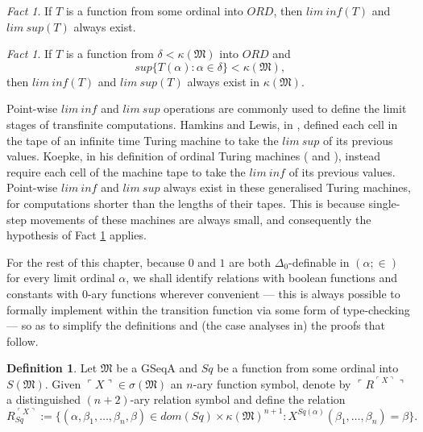 \documentclass[12pt, twoside]{memoir}
\numberwithin{equation}{section}
\theoremstyle{definition}
\newtheorem{defi}[thm]{Definition}
\theoremstyle{remark}
\newtheorem{fact}[thm]{Fact}
\theoremstyle{definition}
\theoremstyle{definition}
\theoremstyle{definition}
\theoremstyle{remark}
\begin{document}
\begin{fact}
If $T$ is a function from some ordinal into $ORD$, then $lim \ inf (T)$ and $lim \ sup (T)$ always exist.
\end{fact}

\begin{fact}\label{fact230}
If $T$ is a function from $\delta < \kappa(\mathfrak{M})$ into $ORD$ and
\begin{equation*}
    sup \{T(\alpha) : \alpha \in \delta\} < \kappa(\mathfrak{M}) \text{,}
\end{equation*}
then $lim \ inf (T)$ and $lim \ sup (T)$ always exist in $\kappa(\mathfrak{M})$.
\end{fact}

Point-wise $lim \ inf$ and $lim \ sup$ operations are commonly used to define the limit stages of transfinite computations. Hamkins and Lewis, in \cite{ittm}, defined each cell in the tape of an infinite time Turing machine to take the $lim \ sup$ of its previous values. Koepke, in his definition of ordinal Turing machines (\cite{koepke1} and \cite{koepke2}), instead require each cell of the machine tape to take the $lim \ inf$ of its previous values. Point-wise $lim \ inf$ and $lim \ sup$ always exist in these generalised Turing machines, for computations shorter than the lengths of their tapes. This is because single-step movements of these machines are always small, and consequently the hypothesis of Fact \ref{fact230} applies.

For the rest of this chapter, because $0$ and $1$ are both $\Delta_0$-definable in $(\alpha; \in)$ for every limit ordinal $\alpha$, we shall identify relations with boolean functions and constants with $0$-ary functions wherever convenient --- this is always possible to formally implement within the transition function via some form of type-checking --- so as to simplify the definitions and (the case analyses in) the proofs that follow. 

\begin{defi}
Let $\mathfrak{M}$ be a GSeqA and $Sq$ be a function from some ordinal into $S(\mathfrak{M})$. Given $\ulcorner X \urcorner \in \sigma(\mathfrak{M})$ an $n$-ary function symbol, denote by $\ulcorner R^{\ulcorner X \urcorner} \urcorner$ a distinguished $(n+2)$-ary relation symbol and define the relation 
\begin{equation*}
    R_{Sq}^{\ulcorner X \urcorner} := \{(\alpha, \beta_1, \dots, \beta_n, \beta) \in dom(Sq) \times \kappa(\mathfrak{M})^{n+1} : X^{Sq(\alpha)} (\beta_1, \dots, \beta_n) = \beta\} \text{.}
\end{equation*}
\end{defi}
\end{document}
